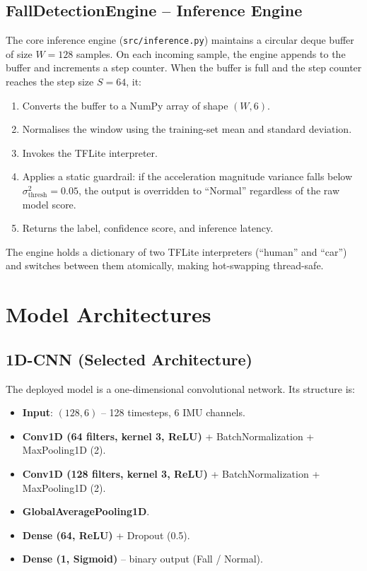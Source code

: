 \subsection{FallDetectionEngine -- Inference Engine}

The core inference engine (\texttt{src/inference.py}) maintains a circular deque buffer of size $W = 128$ samples. On each incoming sample, the engine appends to the buffer and increments a step counter. When the buffer is full and the step counter reaches the step size $S = 64$, it:
\begin{enumerate}
    \item Converts the buffer to a NumPy array of shape $(W, 6)$.
    \item Normalises the window using the training-set mean and standard deviation.
    \item Invokes the TFLite interpreter.
    \item Applies a static guardrail: if the acceleration magnitude variance falls below $\sigma^2_{\text{thresh}} = 0.05$, the output is overridden to ``Normal'' regardless of the raw model score.
    \item Returns the label, confidence score, and inference latency.
\end{enumerate}

The engine holds a dictionary of two TFLite interpreters (``human'' and ``car'') and switches between them atomically, making hot-swapping thread-safe.

\section{Model Architectures}
\label{sec:models}

\subsection{1D-CNN (Selected Architecture)}

The deployed model is a one-dimensional convolutional network. Its structure is:

\begin{itemize}
    \item \textbf{Input}: $(128, 6)$ -- 128 timesteps, 6 IMU channels.
    \item \textbf{Conv1D (64 filters, kernel 3, ReLU)} + BatchNormalization + MaxPooling1D (2).
    \item \textbf{Conv1D (128 filters, kernel 3, ReLU)} + BatchNormalization + MaxPooling1D (2).
    \item \textbf{GlobalAveragePooling1D}.
    \item \textbf{Dense (64, ReLU)} + Dropout (0.5).
    \item \textbf{Dense (1, Sigmoid)} -- binary output (Fall / Normal).
\end{itemize}

